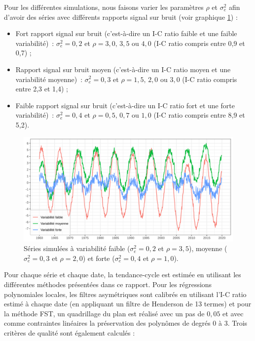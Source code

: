 \documentclass[
  12pt,
  a4paper,french]{article}
\newcommand\1{\mathds{1}}
\begin{document}
Pour les différentes simulations, nous faisons varier les paramètres \(\rho\) et \(\sigma_e^2\) afin d'avoir des séries avec différents rapports signal sur bruit (voir graphique \ref{fig:graphs-data-simul}) :

\begin{itemize}
\item
  Fort rapport signal sur bruit (c'est-à-dire un I-C ratio faible et une faible variabilité)~: \(\sigma_e^2=0,2\) et \(\rho = 3,0,\, 3,5\) ou \(4,0\) (I-C ratio compris entre 0,9 et 0,7) ;
\item
  Rapport signal sur bruit moyen (c'est-à-dire un I-C ratio moyen et une variabilité moyenne)~: \(\sigma_e^2=0,3\) et \(\rho = 1,5,\, 2,0\) ou \(3,0\) (I-C ratio compris entre 2,3 et 1,4) ;
\item
  Faible rapport signal sur bruit (c'est-à-dire un I-C ratio fort et une forte variabilité)~: \(\sigma_e^2=0,4\) et \(\rho = 0,5,\, 0,7\) ou \(1,0\) (I-C ratio compris entre 8,9 et 5,2).
\end{itemize}

\begin{figure}

{\centering \includegraphics[width=1\linewidth]{img/simulations/simul_data} 

}

\caption[Séries simulées à variabilité faible (\(\sigma_e^2=0,2\) et \(\rho = 3,5\)), moyenne (\(\sigma_e^2=0,3\) et \(\rho = 2,0\)) et forte (\(\sigma_e^2=0,4\) et \(\rho = 1,0\))]{Séries simulées à variabilité faible (\(\sigma_e^2=0,2\) et \(\rho = 3,5\)), moyenne (\(\sigma_e^2=0,3\) et \(\rho = 2,0\)) et forte (\(\sigma_e^2=0,4\) et \(\rho = 1,0\)).}\label{fig:graphs-data-simul}

\footnotesize
\normalsize\end{figure}

Pour chaque série et chaque date, la tendance-cycle est estimée en utilisant les différentes méthodes présentées dans ce rapport.
Pour les régressions polynomiales locales, les filtres asymétriques sont calibrés en utilisant l'I-C ratio estimé à chaque date (en appliquant un filtre de Henderson de 13 termes) et pour la méthode FST, un quadrillage du plan est réalisé avec un pas de \(0,05\) et avec comme contraintes linéaires la préservation des polynômes de degrés 0 à 3.
Trois critères de qualité sont également calculés :
\end{document}
